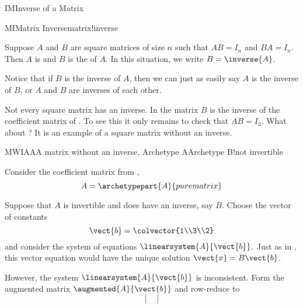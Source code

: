 \begin{subsect}{IM}{Inverse of a Matrix}
%
\begin{definition}{MI}{Matrix Inverse}{matrix!inverse}
\begin{para}Suppose $A$ and $B$ are square matrices of size $n$ such that $AB=I_n$ and $BA=I_n$.  Then $A$ is  and $B$ is the  of $A$.  In this situation, we write $B=\inverse{A}$.\end{para}
\end{definition}
%
\begin{para}Notice that if $B$ is the inverse of $A$, then we can just as easily say $A$ is the inverse of $B$, or $A$ and $B$ are inverses of each other.\end{para}
%
\begin{para}Not every square matrix has an inverse.  In  the matrix $B$ is the inverse of the coefficient matrix of .  To see this it only remains to check that $AB=I_3$.  What about ?  It is an example of a square matrix without an inverse.\end{para}
%
\begin{example}{MWIAA}{A matrix without an inverse, Archetype A}{Archetype B!not invertible}
\begin{para}Consider the coefficient matrix from ,
%
\begin{equation*}
A=\archetypepart{A}{purematrix}\end{equation*}\end{para}
%
\begin{para}Suppose that $A$ is invertible and does have an inverse, say $B$.  Choose the vector of constants
%
\begin{equation*}
\vect{b}=\colvector{1\\3\\2}
\end{equation*}
%
and consider the system of equations $\linearsystem{A}{\vect{b}}$.  Just as in , this vector equation would have the unique solution $\vect{x}=B\vect{b}$.\end{para}
%
\begin{para}However, the system $\linearsystem{A}{\vect{b}}$ is inconsistent.  Form the augmented matrix $\augmented{A}{\vect{b}}$ and row-reduce to
%
\begin{equation*}
\begin{bmatrix}

\end{bmatrix}
\end{equation*}
\end{para}
\end{example}
\end{subsect}
